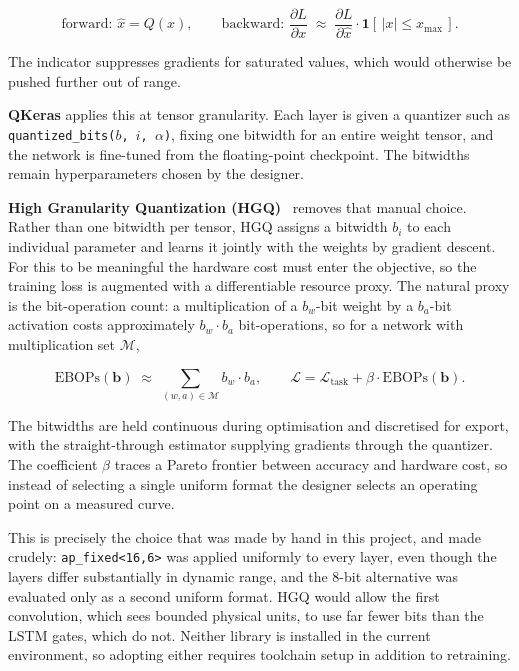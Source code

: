 \documentclass[11pt,a4paper]{article}
\begin{document}
\begin{equation}
\text{forward: } \hat{x} = Q(x),
\qquad
\text{backward: } \frac{\partial L}{\partial x}
  \;\approx\; \frac{\partial L}{\partial \hat{x}}
  \cdot \mathbf{1}\!\left[\,|x| \le x_{\max}\,\right].
\end{equation}

The indicator suppresses gradients for saturated values, which would otherwise
be pushed further out of range.

\textbf{QKeras} applies this at tensor granularity. Each layer is given a
quantizer such as \texttt{quantized\_bits($b$, $i$, $\alpha$)}, fixing one
bitwidth for an entire weight tensor, and the network is fine-tuned from the
floating-point checkpoint. The bitwidths remain hyperparameters chosen by the
designer.

\textbf{High Granularity Quantization (HGQ)}~\cite{hgq} removes that manual
choice. Rather than one bitwidth per tensor, HGQ assigns a bitwidth $b_i$ to
each individual parameter and learns it jointly with the weights by gradient
descent. For this to be meaningful the hardware cost must enter the objective,
so the training loss is augmented with a differentiable resource proxy. The
natural proxy is the bit-operation count: a multiplication of a $b_w$-bit
weight by a $b_a$-bit activation costs approximately $b_w \cdot b_a$
bit-operations, so for a network with multiplication set $\mathcal{M}$,

\begin{equation}
\mathrm{EBOPs}(\mathbf{b}) \;\approx\;
  \sum_{(w,a) \in \mathcal{M}} b_w \cdot b_a ,
\qquad
\mathcal{L} = \mathcal{L}_{\mathrm{task}}
  + \beta \cdot \mathrm{EBOPs}(\mathbf{b}).
\end{equation}

The bitwidths are held continuous during optimisation and discretised for
export, with the straight-through estimator supplying gradients through the
quantizer. The coefficient $\beta$ traces a Pareto frontier between accuracy
and hardware cost, so instead of selecting a single uniform format the designer
selects an operating point on a measured curve.

This is precisely the choice that was made by hand in this project, and made
crudely: \texttt{ap\_fixed<16,6>} was applied uniformly to every layer, even
though the layers differ substantially in dynamic range, and the 8-bit
alternative was evaluated only as a second uniform format. HGQ would allow the
first convolution, which sees bounded physical units, to use far fewer bits
than the LSTM gates, which do not. Neither library is installed in the current
environment, so adopting either requires toolchain setup in addition to
retraining.
\end{document}
